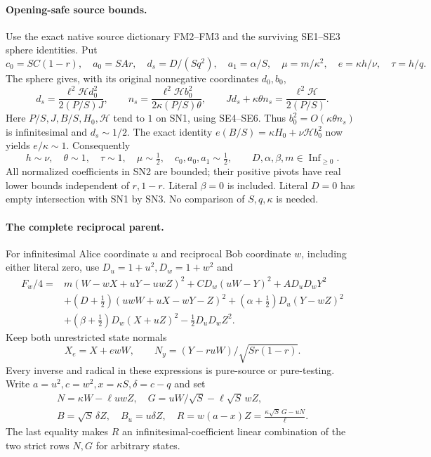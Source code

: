 \paragraph{Opening-safe source bounds.}
Use the exact native source dictionary FM2--FM3 and the surviving
SE1--SE3 sphere identities. Put
\[
 c_0=SC(1-r),\quad a_0=SAr,\quad d_s=D/(Sq^2),\quad
 a_1=\alpha/S,\quad \mu=m/\kappa^2,\quad
 e=\kappa h/\nu,\quad \tau=h/q.
 \tag{SN2}
\]
The sphere gives, with its original nonnegative coordinates $d_0,b_0$,
\[
 d_s=\frac{\ell^2\mathcal H d_0^2}{2(P/S)J},\qquad
 n_s=\frac{\ell^2\mathcal H b_0^2}{2\kappa(P/S)\theta},\qquad
 Jd_s+\kappa\theta n_s=\frac{\ell^2\mathcal H}{2(P/S)}.
 \tag{SN3}
\]
Here $P/S,J,B/S,H_0,\mathcal H$ tend to $1$ on SN1, using SE4--SE6.
Thus $b_0^2=O(\kappa\theta n_s)$ is infinitesimal and $d_s\sim1/2$.
The exact identity $e(B/S)=\kappa H_0+\nu\mathcal H b_0^2$ now yields
$e/\kappa\sim1$. Consequently
\[
 h\sim\nu,\quad\theta\sim1,\quad\tau\sim1,\quad
 \mu\sim\tfrac12,\quad c_0,a_0,a_1\sim\tfrac12,
 \qquad D,\alpha,\beta,m\in\operatorname{Inf}_{\ge0}.
 \tag{SN4}
\]
All normalized coefficients in SN2 are bounded; their positive pivots
have real lower bounds independent of $r,1-r$. Literal $\beta=0$ is
included. Literal $D=0$ has empty intersection with SN1 by SN3. No
comparison of $S,q,\kappa$ is needed.

\paragraph{The complete reciprocal parent.}
For infinitesimal Alice coordinate $u$ and reciprocal Bob coordinate
$w$, including either literal zero, use $D_u=1+u^2,D_w=1+w^2$ and
\[
\begin{split}
 F_w/4={}&m(W-wX+uY-uwZ)^2+CD_w(uW-Y)^2+AD_uD_wY^2\\
 &+(D+\tfrac12)(uwW+uX-wY-Z)^2
 +(\alpha+\tfrac12)D_u(Y-wZ)^2\\
 &+(\beta+\tfrac12)D_w(X+uZ)^2-\tfrac12D_uD_wZ^2.
\end{split}\tag{SN5}
\]
Keep both unrestricted state normals
\[
 X_e=X+ewW,\qquad N_y=(Y-ruW)/\sqrt{Sr(1-r)}.
 \tag{SN6}
\]
Every inverse and radical in these expressions is pure-source or
pure-testing. Write $a=u^2,c=w^2,x=\kappa S,\delta=c-q$ and set
\[
\begin{gathered}
 N=\kappa W-\ell uwZ,\quad G=uW/\sqrt S-\ell\sqrt S\,wZ,\\
 B=\sqrt S\,\delta Z,\quad B_u=u\delta Z,\quad
 R=w(a-x)Z=\frac{\kappa\sqrt S\,G-uN}{\ell}.
\end{gathered}\tag{SN7}
\]
The last equality makes $R$ an infinitesimal-coefficient linear
combination of the two strict rows $N,G$ for arbitrary states.

